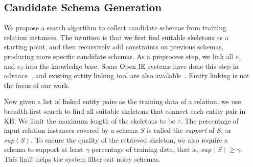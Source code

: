 \subsection{Candidate Schema Generation}
\label{sec:candgen}

We propose a search algorithm to collect 
candidate schemas from training relation instances.
The intuition is that we first find suitable skeletons 
as a starting point, and then recursively add constraints on 
previous schemas, producing more specific candidate schemas.
As a preprocess step, we link all $e_1$ and $e_2$ into the knowledge base.
Some Open IE systems have done this step in 
advance~\cite{gabrilovich2013facc1,nakashole2012patty},
and existing entity linking tool are also 
available~\cite{zuo2014bel,cucerzan2007large}.
Entity linking is not the focus of our work.

Now given a list of linked entity pairs as the training data of a relation,
we use breadth-first search 
to find all suitable skeletons that connect each entity pair in KB.
We limit the maximum length of the skeletons to be $\tau$.
The percentage of input relation instances covered by a schema $S$ 
is called the {\em support} of $S$, or $sup(S)$.
To ensure the quality of the retrieved skeleton, we also require a schema
to support at least $\gamma$ percentage of training data, that is,
$sup(S) \ge \gamma$. 
This limit helps the system filter out noisy schemas. 



